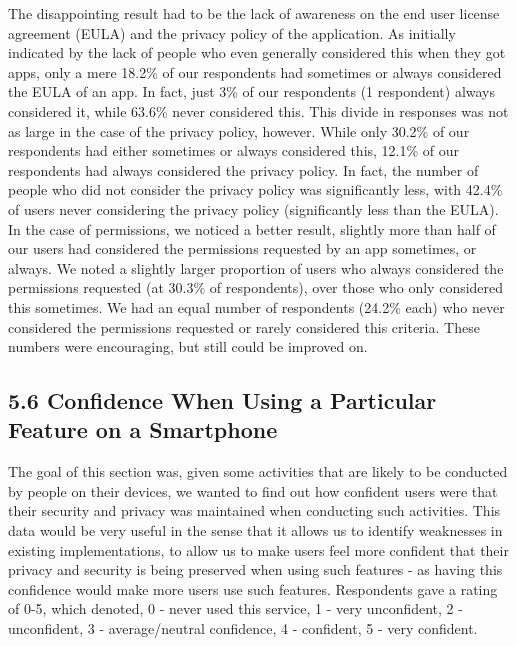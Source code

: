\documentclass{sigchi}
\begin{document}
The disappointing result had to be the lack of awareness on the end user license agreement (EULA) and the privacy policy of the application. As initially indicated by the lack of people who even generally considered this when they got apps, only a mere 18.2\% of our respondents had sometimes or always considered the EULA of an app. In fact, just 3\% of our respondents (1 respondent) always considered it, while 63.6\% never considered this. This divide in responses was not as large in the case of the privacy policy, however. While only 30.2\% of our respondents had either sometimes or always considered this, 12.1\% of our respondents had always considered the privacy policy. In fact, the number of people who did not consider the privacy policy was significantly less, with 42.4\% of users never considering the privacy policy (significantly less than the EULA). In the case of permissions, we noticed a better result, slightly more than half of our users had considered the permissions requested by an app sometimes, or always. We noted a slightly larger proportion of users who always considered the permissions requested (at 30.3\% of respondents), over those who only considered this sometimes. We had an equal number of respondents (24.2\% each) who never considered the permissions requested or rarely considered this criteria. These numbers were encouraging, but still could be improved on.

\subsection{5.6 Confidence When Using a Particular Feature on a Smartphone}
The goal of this section was, given some activities that are likely to be conducted by people on their devices, we wanted to find out how confident users were that their security and privacy was maintained when conducting such activities. This data would be very useful in the sense that it allows us to identify weaknesses in existing implementations, to allow us to make users feel more confident that their privacy and security is being preserved when using such features - as having this confidence would make more users use such features. Respondents gave a rating of 0-5, which denoted, 0 - never used this service, 1 - very unconfident, 2 - unconfident, 3 - average/neutral confidence, 4 - confident, 5 - very confident.
\end{document}
